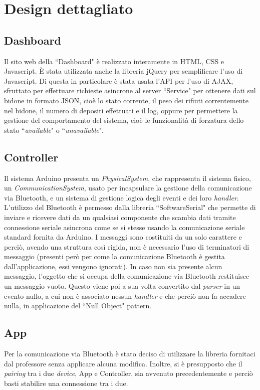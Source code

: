 \documentclass[a4paper, 12pt]{report}
\begin{document}
		\section{Design dettagliato}
			\subsection{Dashboard}
			Il sito web della ``Dashboard" è realizzato interamente in HTML, CSS e Javascript. È stata
			utilizzata anche la libreria jQuery per semplificare l'uso di Javascript. Di questa in
			particolare è stata usata l'API per l'uso di AJAX, sfruttato per effettuare richieste
			asincrone al server ``Service" per ottenere dati sul bidone in formato JSON, cioè lo stato corrente,
			il peso dei rifiuti correntemente nel bidone, il numero di depositi effettuati e il log,
			oppure per permettere la gestione del comportamento del sistema, cioè le
			funzionalità di forzatura dello stato ``\textit{available}" o ``\textit{unavailable}".
			\subsection{Controller}
			Il sistema Arduino presenta un \textit{PhysicalSystem}, che rappresenta il sistema fisico, 
			un \textit{CommunicationSystem}, usato per incapsulare la gestione della comunicazione via Bluetooth, 
			e un sistema di gestione logica degli eventi e dei loro \textit{handler}.\newline
			L'utilizzo del Bluetooth è permesso dalla libreria ``SoftwareSerial" che permette di inviare
			e ricevere dati da un qualsiasi componente che scambia dati tramite connessione seriale
			asincrona come se si stesse usando la comunicazione seriale standard fornita da Arduino.\newline 
			I messaggi sono costituiti da un solo carattere e perciò, avendo una struttura così
			rigida, non è necessario l'uso di terminatori di messaggio (presenti però per come la comunicazione
			Bluetooth è gestita dall'applicazione, essi vengono ignorati).\newline
			In caso non sia presente alcun messaggio, l'oggetto che si occupa della comunicazione via
			Bluetooth restituisce un messaggio vuoto. Questo viene poi a sua volta convertito dal
			\textit{parser} in un evento nullo, a cui non è associato nessun \textit{handler} e che
			perciò non fa accadere nulla, in applicazione del ``Null Object" pattern.
			\subsection{App}
			Per la comunicazione via Bluetooth è stato deciso di utilizzare la libreria fornitaci dal
			professore senza applicare alcuna modifica. Inoltre, si è presupposto che il \textit{pairing}
			tra i due \textit{device}, App e Controller, sia avvenuto precedentemente e perciò basti
			stabilire una connessione tra i due.
\end{document}
